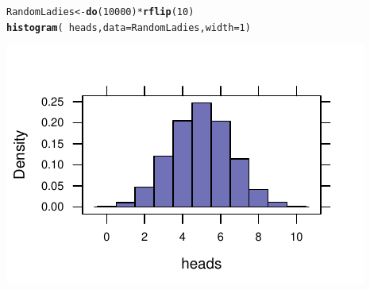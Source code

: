 \documentclass[twoside]{book}\usepackage[]{graphicx}\usepackage[]{xcolor}
\makeatletter
\def\maxwidth{ %
  \ifdim\Gin@nat@width>\linewidth
    \linewidth
  \else
    \Gin@nat@width
  \fi
}
\newcommand{\hlnum}[1]{\textcolor[rgb]{0.686,0.059,0.569}{#1}}%
\newcommand{\hlopt}[1]{\textcolor[rgb]{0,0,0}{#1}}%
\newcommand{\hlstd}[1]{\textcolor[rgb]{0.345,0.345,0.345}{#1}}%
\newcommand{\hlkwb}[1]{\textcolor[rgb]{0.69,0.353,0.396}{#1}}%
\newcommand{\hlkwc}[1]{\textcolor[rgb]{0.333,0.667,0.333}{#1}}%
\newcommand{\hlkwd}[1]{\textcolor[rgb]{0.737,0.353,0.396}{\textbf{#1}}}%
\newenvironment{kframe}{%
 \def\at@end@of@kframe{}%
 \ifinner\ifhmode%
  \def\at@end@of@kframe{\end{minipage}}%
  \begin{minipage}{\columnwidth}%
 \fi\fi%
 \def\FrameCommand##1{\hskip\@totalleftmargin \hskip-\fboxsep
 \colorbox{shadecolor}{##1}\hskip-\fboxsep
     \hskip-\linewidth \hskip-\@totalleftmargin \hskip\columnwidth}%
 \MakeFramed {\advance\hsize-\width
   \@totalleftmargin\z@ \linewidth\hsize
   \@setminipage}}%
 {\par\unskip\endMakeFramed%
 \at@end@of@kframe}
\newenvironment{knitrout}{}{} %
\makeatother
\begin{document}
\begin{knitrout}
\color{fgcolor}\begin{kframe}
\begin{alltt}
\hlstd{RandomLadies} \hlkwb{<-} \hlkwd{do}\hlstd{(}\hlnum{10000}\hlstd{)} \hlopt{*} \hlkwd{rflip}\hlstd{(}\hlnum{10}\hlstd{)}
\hlkwd{histogram}\hlstd{(} \hlopt{~} \hlstd{heads,} \hlkwc{data} \hlstd{= RandomLadies,} \hlkwc{width} \hlstd{=} \hlnum{1}\hlstd{)}
\end{alltt}
\end{kframe}

{\centering \includegraphics[width=\maxwidth]{figures/fig-flip4-1} 

}



\end{knitrout}
\end{document}
